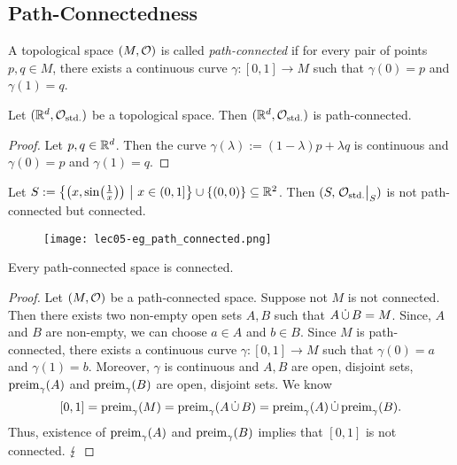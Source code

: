\subsection{Path-Connectedness}
\begin{definition}\label{def:path_connected_space}
	A topological space \((M, \mathcal{O})\) is called \emph{path-connected} if for every pair of points \(p, q \in M\), there exists a continuous curve \(\gamma: [0, 1] \to M\) such that \(\gamma(0) = p\) and \(\gamma(1) = q\).
\end{definition}

\begin{example}
	Let \((\mathbb R^d, \mathcal{O}_{\text{std.}})\) be a topological space. Then \((\mathbb R^d, \mathcal{O}_{\text{std.}})\) is path-connected.
\end{example}
\begin{proof}
	Let \(p, q \in \mathbb R^d\). Then the curve \(\gamma(\lambda) := (1 - \lambda)p + \lambda q\) is continuous and \(\gamma(0) = p\) and \(\gamma(1) = q\).
\end{proof}

\begin{example}
	Let \(S := \qty{\qty(x, \sin(\frac{1}{x})) \ \middle|\ x \in (0, 1]} \cup \qty{(0, 0)} \subseteq \mathbb R^2\). Then \((S, \eval{\Ostd}_{S})\) is not path-connected but connected.
	\begin{figure}[H]
		\centering
		\texttt{[image: lec05-eg\_path\_connected.png]}
	\end{figure}
\end{example}

\begin{theorem}
	Every path-connected space is connected.
\end{theorem}
\begin{proof}
	Let \((M, \mathcal{O})\) be a path-connected space. Suppose not \(M\) is not connected. Then there exists two non-empty open sets \(A, B\) such that \(A \operatorname{\dot{\cup}} B = M\). Since, \(A\) and \(B\) are non-empty, we can choose \(a \in A\) and \(b \in B\). Since \(M\) is path-connected, there exists a continuous curve \(\gamma: [0, 1] \to M\) such that \(\gamma(0) = a\) and \(\gamma(1) = b\). Moreover, \(\gamma\) is continuous and \(A, B\) are open, disjoint sets, \(\operatorname{preim}_{\gamma}(A)\) and \(\operatorname{preim}_{\gamma}(B)\) are open, disjoint sets. We know
	\begin{equation*}
		\qty[0, 1] = \operatorname{preim}_{\gamma}(M) = \operatorname{preim}_{\gamma}(A \operatorname{\dot{\cup}} B) = \operatorname{preim}_{\gamma}(A) \operatorname{\dot{\cup}} \operatorname{preim}_{\gamma}(B).
	\end{equation*}
	Thus, existence of \(\operatorname{preim}_{\gamma}(A)\) and \(\operatorname{preim}_{\gamma}(B)\) implies that \([0, 1]\) is not connected. \(\operatorname{\lightning}\)
\end{proof}


